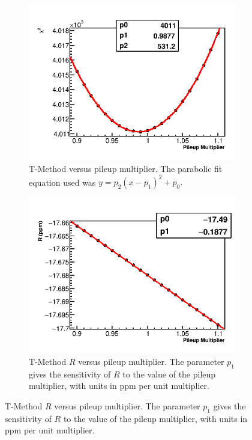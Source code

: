 \begin{figure}[h]
\centering
    \begin{subfigure}[t]{0.4\textwidth}
        \centering
        \includegraphics[width=\textwidth]{TMethod_Chi2_Vs_PileupMultiplier_Canv}
        \caption{T-Method \chisq versus pileup multiplier. The parabolic fit equation used was $y = p_{2}(x - p_{1})^{2} + p_{0}.$}
    \end{subfigure}%
    \hspace{1cm}
    \begin{subfigure}[t]{0.4\textwidth}
        \centering
        \includegraphics[width=\textwidth]{TMethod_R_Vs_PileupMultiplier_Canv}
        \caption{T-Method $R$ versus pileup multiplier. The parameter $p_{1}$ gives the sensitivity of $R$ to the value of the pileup multiplier, with units in ppm per unit multiplier.}
    \end{subfigure}


\end{figure}
